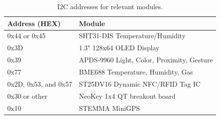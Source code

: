 \begin{table}[!ht]
	\centering
	\begin{tabular}{l l}
		\hline
		Address (HEX) & Module \\ 
		\hline
		0x44 or 0x45 & SHT31-DIS Temperature/Humidity \\
		0x3D & 1.3" 128x64 OLED Display \\
		0x39 & APDS-9960 Light, Color, Proximity, Gesture \\
		0x77 & BME688 Temperature, Humidity, Gas \\
		0x2D, 0x53, and 0x57 & ST25DV16 Dynamic NFC/RFID Tag IC \\
		0x30 or other  & NeoKey 1x4 QT breakout board \\
		0x10 & STEMMA MiniGPS \\
		\hline
	\end{tabular}
	\caption{I2C addresses for relevant modules.}
	\label{table:i2caddresses}
\end{table}